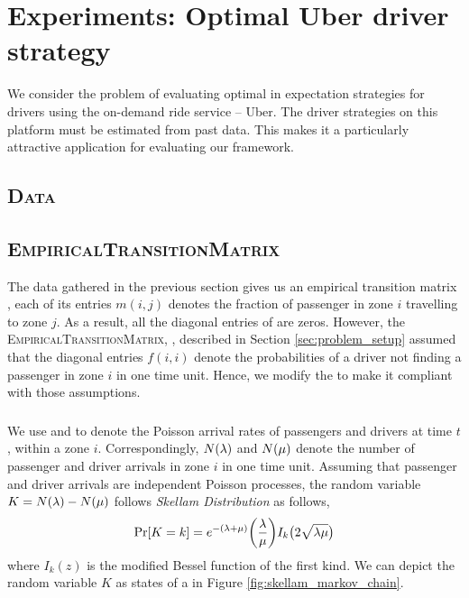 
\section{Experiments: Optimal Uber driver strategy}
\label{sec:experiments}

We consider the problem of evaluating optimal in expectation strategies for drivers using the on-demand ride service -- Uber. The driver strategies on this platform must be estimated from past data. This makes it a particularly attractive application for evaluating our framework.

\subsection{\textsc{Data}}
\label{sec:data}

\subsection{\textsc{EmpiricalTransitionMatrix}}

The data gathered in the previous section gives us an empirical transition matrix {}, each of its entries $m(i,j)$ denotes the fraction of passenger in zone $i$ travelling to zone $j$. As a result, all the diagonal entries of {} are zeros. However, the \textsc{EmpiricalTransitionMatrix}, {\empiricaltransitionmatrix}, described in Section \ref{sec:problem_setup} assumed that the diagonal entries $f(i,i)$ denote the probabilities of a driver not finding a passenger in zone $i$ in one time unit. Hence, we modify the {} to make it compliant with those assumptions.

\subsubsection{}

We use {\passengerarrivalrate} and {\driverarrivalrate} to denote the Poisson arrival rates of passengers and drivers at time $t$, within a zone $i$. Correspondingly, $N(\lambda)$ and $N(\mu)$ denote the number of passenger and driver arrivals in zone $i$ in one time unit. Assuming that passenger and driver arrivals are independent Poisson processes, the random variable $K = N(\lambda) - N(\mu)$ follows \textit{Skellam Distribution} as follows,
\begin{equation}
\Pr[K=k] = e^{-(\lambda + \mu)} \bigg(\frac{\lambda}{\mu}\bigg) I_k\big(2 \sqrt{\lambda \mu}\big)
\end{equation}
where $I_k(z)$ is the modified Bessel function of the first kind. We can depict the random variable $K$ as states of a {\markovchain} in Figure \ref{fig:skellam_markov_chain}.

